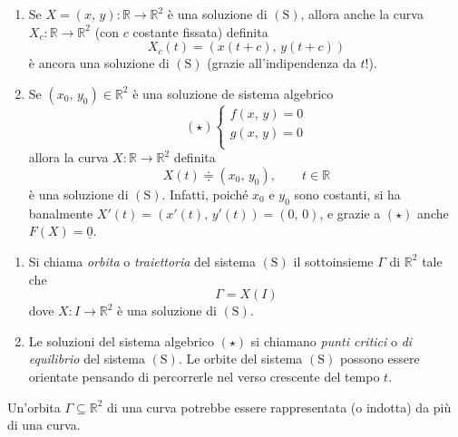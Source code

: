\begin{obs}
\mbox{}
\begin{enumerate}[labelindent=\parindent,leftmargin=*,label=\textnormal{(\arabic*)},start=1]
\item Se $X = (x,\,y) : \mathbb{R} \longrightarrow \mathbb{R}^2$ è una soluzione di $\mathrm{(S)}$, allora anche la curva $X_{c} : \mathbb{R} \longrightarrow \mathbb{R}^2$ (con $c$ costante fissata) definita
$$
X_c(t) = \left( x(t+c),\,y(t+c) \right)
$$
è ancora una soluzione di $\mathrm{(S)}$ (grazie all'indipendenza da $t$!).
\item Se $(x_0,\,y_0) \in \mathbb{R}^2$ è una soluzione de sistema algebrico
$$
\mathrm{(\star)}
\begin{cases}
f(x,\,y) = 0\\
g(x,\,y) = 0\\
\end{cases}
$$
allora la curva $X : \mathbb{R} \longrightarrow \mathbb{R}^2$ definita
$$
X(t) \doteqdot (x_0,\,y_0), \qquad t \in \mathbb{R}
$$
è una soluzione di $\mathrm{(S)}$. Infatti, poiché $x_0$ e $y_0$ sono costanti, si ha banalmente $X'(t) = (x'(t),\,y'(t)) = (0,\,0)$, e grazie a $\mathrm{(\star)}$ anche $F(X) = \underline{0}$.
\end{enumerate}
\end{obs}


\begin{definition}
\mbox{}
\begin{enumerate}[labelindent=\parindent,leftmargin=*,label=\textnormal{(\roman*)},start=1]
\item Si chiama \emph{orbita} o \emph{traiettoria} del sistema $\mathrm{(S)}$ il sottoinsieme $\Gamma$ di $\mathbb{R}^2$ tale che
$$
\Gamma = X(I)
$$
dove $X : I \longrightarrow \mathbb{R}^2$ è una soluzione di $\mathrm{(S)}$.
\item Le soluzioni del sistema algebrico $\mathrm{(\star)}$ si chiamano \emph{punti critici} o \emph{di equilibrio} del sistema $\mathrm{(S)}$.
Le orbite del sistema $\mathrm{(S)}$ possono essere orientate pensando di percorrerle nel verso crescente del tempo $t$.
\end{enumerate}
\end{definition}

\begin{obs}
Un'orbita $\Gamma \subseteq \mathbb{R}^2$ di una curva potrebbe essere rappresentata (o indotta) da più di una curva.
\end{obs}

